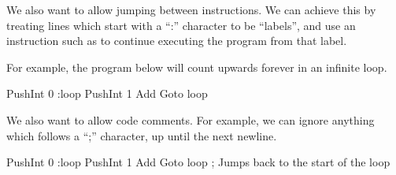 We also want to allow jumping between instructions. We can achieve this by treating lines which start with a ``:'' character to be ``labels'', and use an instruction such as  to continue executing the program from that label.

For example, the program below will count upwards forever in an infinite loop.

\begin{stdout}
PushInt 0
:loop
PushInt 1
Add
Goto loop
\end{stdout}

We also want to allow code comments. For example, we can ignore anything which follows a ``;'' character, up until the next newline.

\begin{stdout}
PushInt 0
:loop
PushInt 1
Add
Goto loop       ; Jumps back to the start of the loop
\end{stdout}